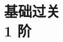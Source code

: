 \documentclass[zihao=5]{ctexbook}
\begin{document}
\frontmatter
\maketitle
\tableofcontents
\mainmatter
\part{基础过关\texorpdfstring{\\}{}1 阶}

\end{document}
